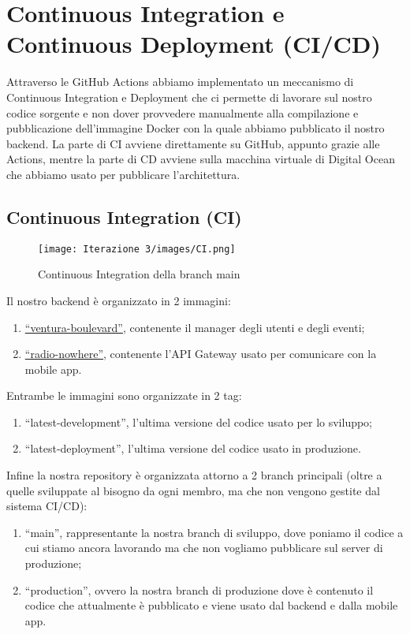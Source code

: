\section{Continuous Integration e Continuous Deployment (CI/CD)}
Attraverso le GitHub Actions abbiamo implementato un meccanismo di Continuous Integration e Deployment che ci permette di lavorare sul nostro codice sorgente e non dover provvedere manualmente alla compilazione e pubblicazione dell'immagine Docker con la quale abbiamo pubblicato il nostro backend. La parte di CI avviene direttamente su GitHub, appunto grazie alle Actions, mentre la parte di CD avviene sulla macchina virtuale di Digital Ocean che abbiamo usato per pubblicare l'architettura.
\subsection{Continuous Integration (CI)}
\begin{figure}[h!]
  \centering
  \texttt{[image: Iterazione 3/images/CI.png]}
  \caption{Continuous Integration della branch main}
\end{figure}
Il nostro backend è organizzato in 2 immagini:
\begin{enumerate}
  \item \href{https://hub.docker.com/repository/docker/freddy153/ventura_boulevard/general}{``ventura-boulevard''}, contenente il manager degli utenti e degli eventi;
  \item \href{https://hub.docker.com/repository/docker/freddy153/radio_nowhere/general}{``radio-nowhere''}, contenente l'API Gateway usato per comunicare con la mobile app.
\end{enumerate}
Entrambe le immagini sono organizzate in 2 tag:
\begin{enumerate}
  \item ``latest-development'', l'ultima versione del codice usato per lo sviluppo;
  \item ``latest-deployment'', l'ultima versione del codice usato in produzione.
\end{enumerate}
Infine la nostra repository è organizzata attorno a 2 branch principali (oltre a quelle sviluppate al bisogno da ogni membro, ma che non vengono gestite dal sistema CI/CD):
\begin{enumerate}
  \item ``main'', rappresentante la nostra branch di sviluppo, dove poniamo il codice a cui stiamo ancora lavorando ma che non vogliamo pubblicare sul server di produzione;
  \item  ``production'', ovvero la nostra branch di produzione dove è contenuto il codice che attualmente è pubblicato e viene usato dal backend e dalla mobile app.
\end{enumerate}
